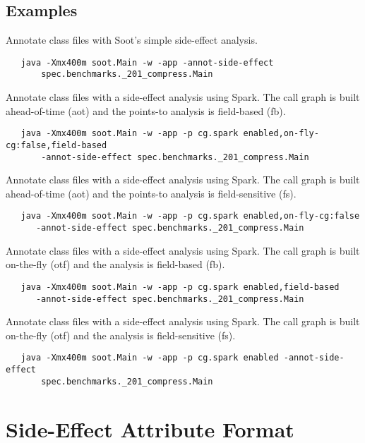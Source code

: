 \documentclass{article}
\begin{document}
\subsection{Examples}

Annotate class files with Soot's simple side-effect analysis. 
\begin{verbatim}
   java -Xmx400m soot.Main -w -app -annot-side-effect 
       spec.benchmarks._201_compress.Main 
\end{verbatim}

Annotate class files with a side-effect analysis using Spark. The call
graph is built ahead-of-time (aot) and the points-to analysis is field-based (fb).
\begin{verbatim}
   java -Xmx400m soot.Main -w -app -p cg.spark enabled,on-fly-cg:false,field-based 
       -annot-side-effect spec.benchmarks._201_compress.Main
\end{verbatim}

Annotate class files with a side-effect analysis using Spark. The call
graph is built ahead-of-time (aot) and the points-to analysis is
field-sensitive (fs).
\begin{verbatim}
   java -Xmx400m soot.Main -w -app -p cg.spark enabled,on-fly-cg:false 
      -annot-side-effect spec.benchmarks._201_compress.Main
\end{verbatim}

Annotate class files with a side-effect analysis using Spark. The call
graph is built on-the-fly (otf) and the analysis is
field-based (fb).
\begin{verbatim}
   java -Xmx400m soot.Main -w -app -p cg.spark enabled,field-based 
      -annot-side-effect spec.benchmarks._201_compress.Main
\end{verbatim}

Annotate class files with a side-effect analysis using Spark. The call
graph is built on-the-fly (otf) and the analysis is
field-sensitive (fs).
\begin{verbatim}
   java -Xmx400m soot.Main -w -app -p cg.spark enabled -annot-side-effect 
       spec.benchmarks._201_compress.Main
\end{verbatim}

\section{Side-Effect Attribute Format}
\end{document}
